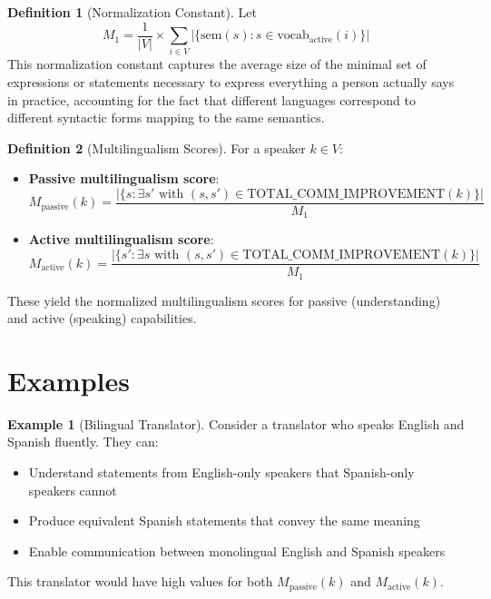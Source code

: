 \documentclass[12pt,a4paper]{article}
\theoremstyle{definition}
\newtheorem{definition}{Definition}
\newtheorem{example}{Example}
\begin{document}
\begin{definition}[Normalization Constant]
Let
\begin{equation}
M_1 = \frac{1}{|V|} \times \sum_{i \in V} |\{\text{sem}(s) : s \in \text{vocab}_{\text{active}}(i)\}|
\end{equation}
This normalization constant captures the average size of the minimal set of expressions or statements necessary to express everything a person actually says in practice, accounting for the fact that different languages correspond to different syntactic forms mapping to the same semantics.
\end{definition}

\begin{definition}[Multilingualism Scores]
For a speaker $k \in V$:
\begin{itemize}
    \item \textbf{Passive multilingualism score}:
    \begin{equation}
    M_{\text{passive}}(k) = \frac{|\{s : \exists s' \text{ with } (s,s') \in \text{TOTAL\_COMM\_IMPROVEMENT}(k)\}|}{M_1}
    \end{equation}

    \item \textbf{Active multilingualism score}:
    \begin{equation}
    M_{\text{active}}(k) = \frac{|\{s' : \exists s \text{ with } (s,s') \in \text{TOTAL\_COMM\_IMPROVEMENT}(k)\}|}{M_1}
    \end{equation}
\end{itemize}
These yield the normalized multilingualism scores for passive (understanding) and active (speaking) capabilities.
\end{definition}

\section{Examples}

\begin{example}[Bilingual Translator]
Consider a translator who speaks English and Spanish fluently. They can:
\begin{itemize}
    \item Understand statements from English-only speakers that Spanish-only speakers cannot
    \item Produce equivalent Spanish statements that convey the same meaning
    \item Enable communication between monolingual English and Spanish speakers
\end{itemize}
This translator would have high values for both $M_{\text{passive}}(k)$ and $M_{\text{active}}(k)$.
\end{example}
\end{document}
